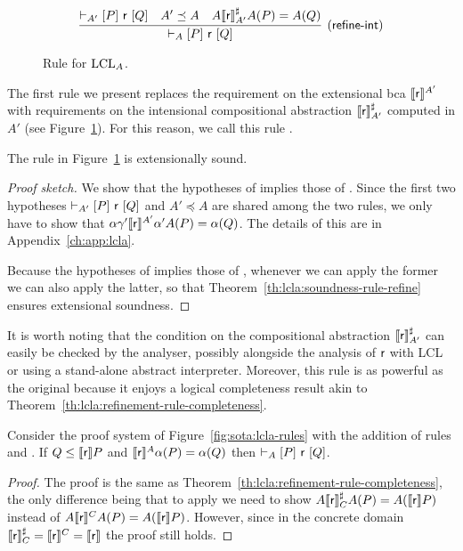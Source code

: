 \begin{figure*}[t]
	\begin{framed}
		\[
		\infer[\lclrule{refine\mbox{-}int}]
		{\lcl{A}{P}{\regr}{Q}}
		{\lcl{A'}{P}{\regr}{Q} \quad A' \preceq A \quad A \denot{\regr}^{\sharp}_{A'} A(P) = A(Q) }
		\]
	\end{framed}
	\vspace{-1ex}
	\caption{Rule  for $\text{LCL}_A$.}\label{fig:lcla:rule-refine-int}
\end{figure*}

The first rule we present replaces the requirement on the extensional bca $\llbracket\mathsf{r}\rrbracket^{A'}$ with requirements on the intensional compositional abstraction $\llbracket\mathsf{r}\rrbracket^{\sharp}_{A'}$ computed in $A'$ (see Figure~\ref{fig:lcla:rule-refine-int}). For this reason, we call this rule .

\begin{prop}\label{th:lcla:refine-int-sound}
	The rule  in Figure~\ref{fig:lcla:rule-refine-int} is extensionally sound.
\end{prop}
\begin{proof}[Proof sketch]
	We show that the hypotheses of  implies those of . Since the first two hypotheses $\vdash_{A'}\nobreak[P]~\mathsf{r}~[Q]$ and $A' \preceq A$ are shared among the two rules, we only have to show that $\alpha \gamma' \llbracket\mathsf{r}\rrbracket^{A'} \alpha' A(P) = \alpha(Q)$. The details of this are in Appendix~\ref{ch:app:lcla}.

	Because the hypotheses of  implies those of , whenever we can apply the former we can also apply the latter, so that Theorem~\ref{th:lcla:soundness-rule-refine} ensures extensional soundness.
\end{proof}

It is worth noting that the condition on the compositional abstraction $\llbracket\mathsf{r}\rrbracket^{\sharp}_{A'}$ can easily be checked by the analyser, possibly alongside the analysis of $\mathsf{r}$ with LCL or using a stand-alone abstract interpreter.
Moreover, this rule is as powerful as the original  because it enjoys a logical completeness result akin to Theorem~\ref{th:lcla:refinement-rule-completeness}.
\begin{theorem}\label{th:lcla:refine-int-completeness}
	Consider the proof system of Figure~\ref{fig:sota:lcla-rules} with the addition of rules  and . If $Q \le \llbracket\mathsf{r}\rrbracket P$ and $\llbracket\mathsf{r}\rrbracket^A \alpha(P) = \alpha(Q)$ then $\vdash_{A}\nobreak[P]~\mathsf{r}~[Q]$.
\end{theorem}
\begin{proof}
	The proof is the same as Theorem~\ref{th:lcla:refinement-rule-completeness}, the only difference being that to apply  we need to show $A \llbracket\mathsf{r}\rrbracket^{\sharp}_{C} A(P) = A(\llbracket\mathsf{r}\rrbracket P)$ instead of $A \llbracket\mathsf{r}\rrbracket^{C} A(P) = A(\llbracket\mathsf{r}\rrbracket P)$. However, since in the concrete domain $\llbracket\mathsf{r}\rrbracket^{\sharp}_{C} = \llbracket\mathsf{r}\rrbracket^{C} = \llbracket\mathsf{r}\rrbracket$ the proof still holds.
\end{proof}

